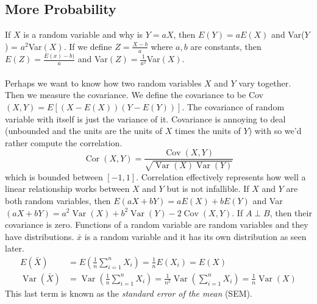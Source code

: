 \documentclass{article}
\theoremstyle{definition}
\begin{document}
\subsection{More Probability}
If $X$ is a random variable and why is $Y=aX$, then $E(Y) =aE(X)$ and Var($Y$) = $a^2$Var$(X)$. If we define $Z = \frac{X-b}{a}$ where $a,b$ are constants, then $E(Z) = \frac{E(x)-b)}{a}$ and Var$(Z) = \frac{1}{a^2}$Var$(X)$.\\\\
Perhaps we want to know how two random variables $X$ and $Y$ vary together. Then we measure the covariance. We define the covariance to be Cov$(X,Y)=E[(X-E(X))(Y-E(Y))]$. The covariance of random variable with itself is just the variance of it. Covariance is annoying to deal (unbounded and the units are the units of $X$ times the units of $Y$) with so we'd rather compute the correlation. 
\begin{equation*}
    \operatorname{Cor}(X,Y) = \frac{\operatorname{Cov}(X,Y)}{\sqrt{\operatorname{Var}(X)\operatorname{Var}(Y)}}
\end{equation*}
which is bounded between $[-1,1]$. Correlation effectively represents how well a linear relationship works between $X$ and $Y$ but is not infallible. If $X$ and $Y$ are both random variables, then $E(aX+bY) = aE(X)+bE(Y)$ and Var$(aX+bY) = a^2 \operatorname{Var}(X)+b^2 \operatorname{Var}(Y) -2\operatorname{Cov}(X,Y) $. If $A\perp B$, then their covariance is zero. Functions of a random variable are random variables and they have distributions. $\bar x$ is a random variable and it has its own distribution as seen later. 
\begin{equation*}
    \begin{split}
        E(\bar X) &= E\left( \frac{1}{n}\sum^n_{i=1} X_i\right) = \frac{1}{n}E(X_i) = E(X) \\
        \operatorname{Var}(\bar X) &= \operatorname{Var}\left(\frac{1}{n} \sum^n_{i=1}X_i \right) = \frac{1}{n^2} \operatorname{Var}\left( \sum^n_{i=1}X_i \right) = \frac{1}{n}\operatorname{Var}(X)
    \end{split}
\end{equation*}
This last term is known  as the \emph{standard error of the mean} (SEM).  
\end{document}
